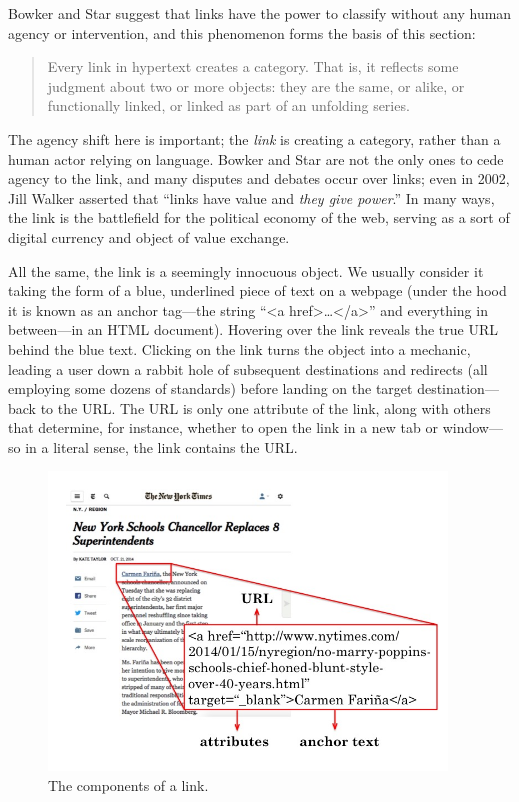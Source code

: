 Bowker and Star suggest that links have the power to classify without any human agency or intervention, and this phenomenon forms the basis of this section: \blockquote{Every link in hypertext creates a category. That is, it reflects some judgment about two or more objects: they are the same, or alike, or functionally linked, or linked as part of an unfolding series.}\autocite[7]{bowker_sorting_2000} The agency shift here is important; the \emph{link} is creating a category, rather than a human actor relying on language. Bowker and Star are not the only ones to cede agency to the link, and many disputes and debates occur over links; even in 2002, Jill Walker asserted that ``links have value and \emph{they give power}.''\autocite{walker_links_2002} In many ways, the link is the battlefield for the political economy of the web, serving as a sort of digital currency and object of value exchange.

All the same, the link is a seemingly innocuous object. We usually consider it taking the form of a blue, underlined piece of text on a webpage (under the hood it is known as an anchor tag---the string ``<a href>\ldots</a>'' and everything in between---in an HTML document). Hovering over the link reveals the true URL behind the blue text. Clicking on the link turns the object into a mechanic, leading a user down a rabbit hole of subsequent destinations and redirects (all employing some dozens of standards) before landing on the target destination---back to the URL. The URL is only one attribute of the link, along with others that determine, for instance, whether to open the link in a new tab or window---so in a literal sense, the link contains the URL.

\begin{figure}[ht]
\centering
\includegraphics[width=300pt]{figures/annotatedlink}
\caption{The components of a link.}
\label{fig:annotatedlink}
\end{figure}

